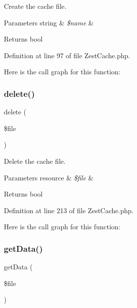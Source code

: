 Create the cache file.


\begin{DoxyParams}[1]{Parameters}
string & {\em \$name} & \\
\hline
\end{DoxyParams}
\begin{DoxyReturn}{Returns}
bool 
\end{DoxyReturn}


Definition at line 97 of file Zest\+Cache.\+php.

Here is the call graph for this function\+:
\mbox{\label{class_zest_1_1_cache_1_1_zest_cache_1_1_zest_cache_a321969477d98aef4154c184217d1c5e0}} 
\subsubsection{\texorpdfstring{delete()}{delete()}}
{\footnotesize\ttfamily delete (\begin{DoxyParamCaption}\item[{}]{\$file }\end{DoxyParamCaption})}

Delete the cache file.


\begin{DoxyParams}[1]{Parameters}
resource & {\em \$file} & \\
\hline
\end{DoxyParams}
\begin{DoxyReturn}{Returns}
bool 
\end{DoxyReturn}


Definition at line 213 of file Zest\+Cache.\+php.

Here is the call graph for this function\+:
\mbox{\label{class_zest_1_1_cache_1_1_zest_cache_1_1_zest_cache_a102396013531dbe613a08448f8ed3e2f}} 
\subsubsection{\texorpdfstring{get\+Data()}{getData()}}
{\footnotesize\ttfamily get\+Data (\begin{DoxyParamCaption}\item[{}]{\$file }\end{DoxyParamCaption})}

